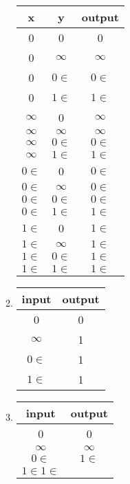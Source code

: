 \begin{enumerate}[label=(\alph*)]
\begin{enumerate}[label=(\roman*)]
                \begin{tabular}{ccc}
                    x&y&output\\
                    \hline
                    0&0&0\\
                    0&$\infty$&$\infty$\\
                    0&$0\in$&$0\in$\\
                    0&$1\in$&$1\in$\\
                    $\infty$&0&$\infty$\\
                    $\infty$&$\infty$&$\infty$\\
                    $\infty$&$0\in$&$0\in$\\
                    $\infty$&$1\in$&$1\in$\\
                    $0\in$&0&$0\in$\\
                    $0\in$&$\infty$&$0\in$\\
                    $0\in$&$0\in$&$0\in$\\
                    $0\in$&$1\in$&$1\in$\\
                    $1\in$&0&$1\in$\\
                    $1\in$&$\infty$&$1\in$\\
                    $1\in$&$0\in$&$1\in$\\
                    $1\in$&$1\in$&$1\in$\\
                    
                \end{tabular}

            \item
                \begin{tabular}{cc}
                    input&output\\
                    \hline
                    0&0\\
                    $\infty$&1\\
                    $0\in$&1\\
                    $1\in$&1
                \end{tabular}

            \item
                \begin{tabular}{cc}
                    input&output\\
                    \hline
                    0&0\\
                    $\infty$&$\infty$\\
                    $0\in$&$1\in$\\
                    $1\in$$1\in$&
                \end{tabular}


\end{enumerate}
\end{enumerate}
